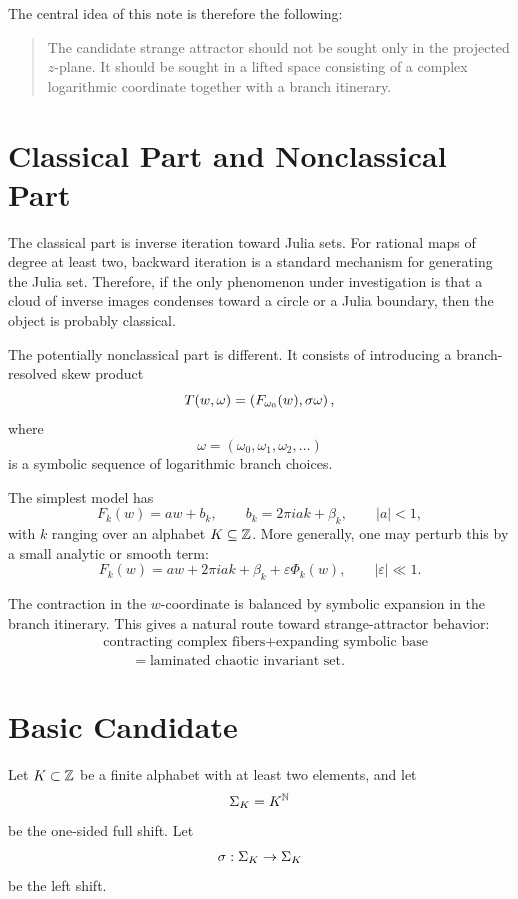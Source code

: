 	The central idea of this note is therefore the following:
	
	\begin{quote}
		The candidate strange attractor should not be sought only in the projected \(z\)-plane. It should be sought in a lifted space consisting of a complex logarithmic coordinate together with a branch itinerary.
	\end{quote}
	
	\section{Classical Part and Nonclassical Part}
	
	The classical part is inverse iteration toward Julia sets. For rational maps of degree at least two, backward iteration is a standard mechanism for generating the Julia set. Therefore, if the only phenomenon under investigation is that a cloud of inverse images condenses toward a circle or a Julia boundary, then the object is probably classical.
	
	The potentially nonclassical part is different. It consists of introducing a branch-resolved skew product
	\[
	T(w,\omega)
	=
	\left(
	F_{\omega_0}(w),
	\sigma \omega
	\right),
	\]
	where
	\[
	\omega=(\omega_0,\omega_1,\omega_2,\dots)
	\]
	is a symbolic sequence of logarithmic branch choices.
	
	The simplest model has
	\[
	F_k(w)=a w + b_k,
	\qquad
	b_k = 2\pi i a k + \beta_k,
	\qquad |a|<1,
	\]
	with \(k\) ranging over an alphabet \(K\subseteq \mathbb{Z}\). More generally, one may perturb this by a small analytic or smooth term:
	\[
	F_k(w)=a w + 2\pi i a k + \beta_k + \varepsilon \Phi_k(w),
	\qquad |\varepsilon|\ll 1.
	\]
	
	The contraction in the \(w\)-coordinate is balanced by symbolic expansion in the branch itinerary. This gives a natural route toward strange-attractor behavior:
	\[
	\begin{aligned}
	&\text{contracting complex fibers}
	+ \text{expanding symbolic base} \\
	&\qquad = \text{laminated chaotic invariant set}.
	\end{aligned}
	\]
	
	\section{Basic Candidate}
	
	Let \(K\subset \mathbb{Z}\) be a finite alphabet with at least two elements, and let
	\[
	\Sigma_K=K^{\mathbb{N}}
	\]
	be the one-sided full shift. Let
	\[
	\sigma:\Sigma_K\to\Sigma_K
	\]
	be the left shift.
	
